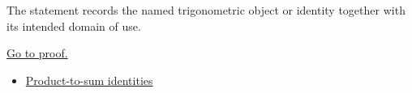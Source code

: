 \begin{remark*}[Interpretation]
The statement records the named trigonometric object or identity together with
its intended domain of use.
\end{remark*}

\begin{remark*}[Proof]
\hyperref[prf:trig-sum-to-product-identities]{Go to proof.}
\end{remark*}
\begin{dependencies}
\begin{itemize}
  \item \hyperref[thm:trig-product-to-sum-identities]{Product-to-sum identities}
\end{itemize}
\end{dependencies}
